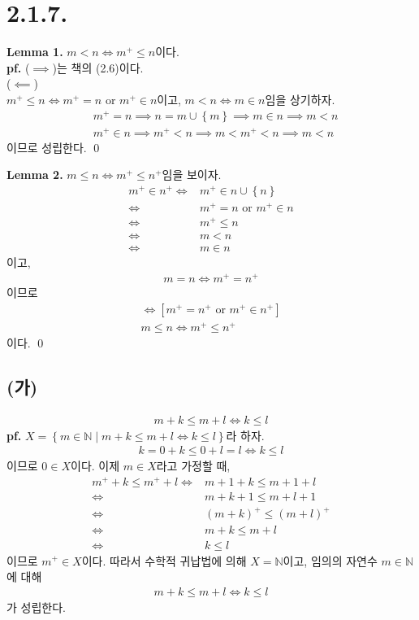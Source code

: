 \documentclass{article}
\begin{document}
\section{2.1.7.}
\textbf{Lemma 1.} $m < n \iff m^+ \le n$이다.
\\\textbf{pf.} ($\implies$)는 책의 (2.6)이다.
\\($\impliedby$)
\\ $m^+ \le n \iff m^+ = n \text{ or } m^+ \in n$이고, $m < n \iff m \in n$임을 상기하자.
\begin{align*}
&m^+ = n \implies n = m \cup \left\{m \right\} \implies m \in n \implies m < n
\\&m^+ \in n \implies m^+ < n \implies m < m^+ < n \implies m < n
\end{align*}이므로 성립한다. \qed

\textbf{Lemma 2.} $m \le n \iff m^+ \le n^+$임을 보이자.
\begin{align*}
m^+ \in n^+ \iff& m^+ \in n \cup \left\{n \right\}
\\ \iff& m^+ = n \text{ or } m^+ \in n
\\ \iff& m^+ \le n
\\ \iff& m < n  \tag{$\because$ Lemma 1.}
\\ \iff& m \in n
\end{align*}이고, 
\begin{align*}
m = n \iff m^+ = n^+
\end{align*}이므로
\begin{align*}
[m = n \text{ or } m \in n] \iff [m^+ = n^+ \text{ or } m^+ \in n^+] 
\\ m \le n \iff m^+ \le n^+
\end{align*}이다. \qed

\subsection{(가)}
\begin{align*}
m + k \le m + l \iff k \le l
\end{align*}
\textbf{pf.} $X = \left\{ m \in \mathbb{N} \mid m + k \le m + l \iff k \le l
 \right\}$라 하자.
\begin{align*}
k = 0 + k \le 0 + l = l \iff k \le l
\end{align*}이므로 $0 \in X$이다. 이제 $m \in X$라고 가정할 때,
\begin{align*}
m^+ + k \le m^+ + l \iff& m + 1 + k \le m + 1 + l
\\ \iff& m + k + 1 \le m + l + 1
\\ \iff& (m+k)^+ \le (m+l)^+
\\ \iff& m+k \le m+l \tag{$\because$ Lemma 2.}
\\ \iff& k \le l
\end{align*}이므로 $m^+ \in X$이다. 따라서 수학적 귀납법에 의해 $X = \mathbb{N}$이고, 임의의 자연수 $m \in \mathbb{N}$에 대해
\begin{align*}
m + k \le m + l \iff k \le l
\end{align*}가 성립한다.
\end{document}

